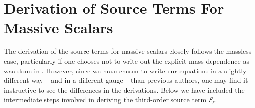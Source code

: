 \documentclass[letterpaper,11pt]{article}
\begin{document}

\appendix
\section{Derivation of Source Terms For Massive Scalars}
\label{source term derivation}
The derivation of the source terms for massive scalars closely follows the massless case, particularly if one chooses not to write out the explicit mass dependence as was done in \cite{1810.04753}. However, since we have chosen to write our equations in a slightly different way -- and in a different gauge -- than previous authors, one may find it instructive to see the differences in the derivations. Below we have included the intermediate steps involved in deriving the third-order source term $S_\ell$.
\end{document}
